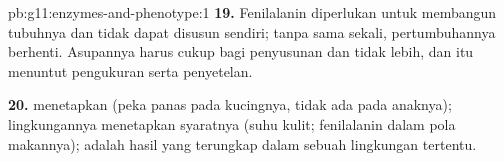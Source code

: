 \begin{solution}{pb:g11:enzymes-and-phenotype:1}
\textbf{19.} Fenilalanin diperlukan untuk membangun  tubuhnya
dan tidak dapat disusun sendiri; tanpa sama sekali, pertumbuhannya
berhenti. Asupannya harus cukup bagi penyusunan  dan tidak
lebih, dan itu menuntut pengukuran serta penyetelan.

\textbf{20.}  menetapkan  (peka panas pada
kucingnya, tidak ada pada anaknya); lingkungannya menetapkan syaratnya
(suhu kulit; fenilalanin dalam pola makannya);  adalah hasil
 yang terungkap dalam sebuah lingkungan tertentu.
\end{solution}

